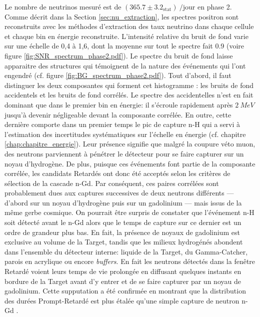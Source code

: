 Le nombre de neutrinos mesuré est de $ (365.7 \pm 3.2_\textrm{stat} ) \SI{}{/\textrm{jour}}$ en phase 2. Comme décrit dans la Section \ref{sec:nu_extraction}, les spectres positron sont reconstruits avec les méthodes d'extraction des taux neutrino dans chaque cellule et chaque bin en énergie reconstruite. L'intensité relative du bruit de fond varie sur une échelle de 0,4 à 1,6, dont la moyenne sur tout le spectre fait 0.9 (voire figure \ref{fig:SNR_spectrum_phase2.pdf}). Le spectre du bruit de fond laisse apparaitre des structures qui témoignent de la nature des événements qui l'ont engendré (cf. figure \ref{fig:BG_spectrum_phase2.pdf}). Tout d'abord, il faut distinguer les deux composantes qui forment cet histogramme : les bruits de fond accidentels et les bruits de fond corrélés. Le spectre des accidentelles n'est en fait dominant que dans le premier bin en énergie: il s'écroule rapidement après $\SI{2}{MeV}$ jusqu'à devenir négligeable devant la composante corrélée. En outre, cette dernière comporte dans un premier temps le pic de capture n-H qui a servi à l'estimation des incertitudes systématiques sur l'échelle en énergie (cf. chapitre \ref{chap:chapitre_energie}). Leur présence signifie que malgré la coupure véto muon, des neutrons parviennent à pénétrer le détecteur pour se faire capturer sur un noyau d'hydrogène. De plus, puisque ces événements font partie de la composante corrélée, les candidats Retardés ont donc été acceptés selon les critères de sélection de la cascade n-Gd. Par conséquent, ces paires corrélées sont probablement dues aux captures successives de deux neutrons différents --- d'abord sur un noyau d'hydrogène puis sur un gadolinium ---  mais issus de la même gerbe cosmique. On pourrait être surpris de constater que l'événement n-H soit détecté avant le n-Gd alors que le temps de capture sur ce dernier est un ordre de grandeur plus bas. En fait, la présence de noyaux de gadolinium est exclusive au volume de la Target, tandis que les milieux hydrogénés abondent dans l'ensemble du détecteur interne: liquide de la Target, du Gamma-Catcher, parois en acrylique ou encore \textit{buffers}. En fait les neutrons détectés dans la fenêtre Retardé voient leurs temps de vie prolongée en diffusant quelques instants en bordure de la Target avant d'y entrer et de se faire capturer par un noyau de gadolinium. Cette supputation a été confirmée en montrant que la distribution des durées Prompt-Retardé est plus étalée qu'une simple capture de neutron n-Gd \cite{docdb293}.\\

